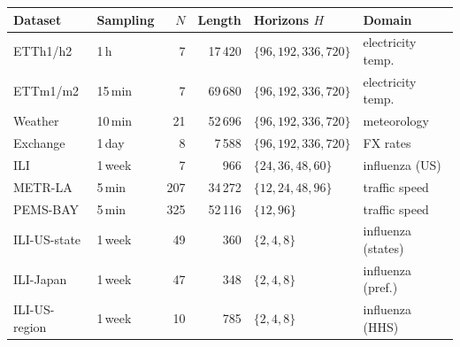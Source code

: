\begin{tabular}{llrrl l}
\toprule
Dataset & Sampling & $N$ & Length & Horizons $H$ & Domain \\
\midrule
ETTh1/h2 & 1\,h & 7 & 17\,420 & $\{96,192,336,720\}$ & electricity temp. \\
ETTm1/m2 & 15\,min & 7 & 69\,680 & $\{96,192,336,720\}$ & electricity temp. \\
Weather & 10\,min & 21 & 52\,696 & $\{96,192,336,720\}$ & meteorology \\
Exchange & 1\,day & 8 & 7\,588 & $\{96,192,336,720\}$ & FX rates \\
ILI & 1\,week & 7 & 966 & $\{24,36,48,60\}$ & influenza (US) \\
METR-LA & 5\,min & 207 & 34\,272 & $\{12,24,48,96\}$ & traffic speed \\
PEMS-BAY & 5\,min & 325 & 52\,116 & $\{12,96\}$ & traffic speed \\
ILI-US-state & 1\,week & 49 & 360 & $\{2,4,8\}$ & influenza (states) \\
ILI-Japan & 1\,week & 47 & 348 & $\{2,4,8\}$ & influenza (pref.) \\
ILI-US-region & 1\,week & 10 & 785 & $\{2,4,8\}$ & influenza (HHS) \\
\bottomrule
\end{tabular}
